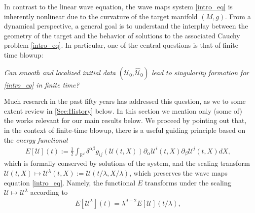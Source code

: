 \documentclass[12pt,reqno]{amsart}
\theoremstyle{plain}
\theoremstyle{remark}
\theoremstyle{plain}
\theoremstyle{definition}
\numberwithin{equation}{section}
\numberwithin{equation}{section}
\def\R{{\mathbb R}}
\begin{document}

	
	In contrast to the linear wave equation, the wave maps system \eqref{intro_eq} is inherently nonlinear due to the curvature of the target manifold $(M,g)$. From a dynamical perspective, a general goal is to understand the interplay between the geometry of the target  and the behavior of solutions to the associated Cauchy problem \eqref{intro_eq}. In particular, one of the central questions is that of finite-time blowup: 
	\begin{center}
		\emph{Can smooth and localized initial data $(\mathcal{U}_0,\hat{\mathcal{U}}_0)$ lead to singularity formation for \eqref{intro_eq} in finite time?}
	\end{center}
	Much research in the past fifty years has addressed this question, as we to some extent review in \autoref{Sec:History} below. In this section we mention only (some of) the works relevant for our main results below.
	We proceed by pointing out that, in the context of finite-time blowup, there is a useful guiding principle based on the \emph{energy functional}
	\begin{align}\label{Def:Energy}
		E[\mathcal{U}](t):=\frac{1}{2}\int_{\R^d} \delta^{\alpha\beta} g_{ij}(\mathcal{U}(t,X))\partial_{\alpha}\mathcal{U}^i(t,X)\partial_{\beta}\mathcal{U}^{j}(t,X) dX,
	\end{align}
	which is formally conserved by solutions of the system, and the scaling transform $\mathcal{U}(t,X) \mapsto \mathcal{U}^{\lambda}(t,X):=\mathcal{U}(t/\lambda,X/\lambda)$, which preserves the wave maps equation \eqref{intro_eq}. Namely, the functional $E$ transforms under the scaling $\mathcal{U} \mapsto \mathcal{U}^{\lambda}$ according to
	\begin{align*}
		E[\mathcal{U}^{\lambda}](t)=\lambda^{d-2} E[\mathcal{U}](t/\lambda),
	\end{align*}
\end{document}
